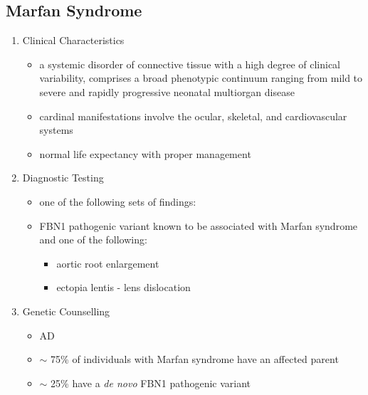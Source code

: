 \documentclass[12pt]{scrartcl}
\begin{document}
\subsection{Marfan Syndrome}
\label{sec:org119cb48}
\begin{enumerate}
\item Clinical Characteristics
\label{sec:org92b42e1}
\begin{itemize}
\item a systemic disorder of connective tissue with a high degree of
clinical variability, comprises a broad phenotypic continuum ranging
from mild to severe and rapidly progressive neonatal multiorgan
disease
\item cardinal manifestations involve the ocular, skeletal, and
cardiovascular systems
\item normal life expectancy with proper management
\end{itemize}
\item Diagnostic Testing
\label{sec:org0484508}
\begin{itemize}
\item one of the following sets of findings:

\item FBN1 pathogenic variant known to be associated with Marfan syndrome
and one of the following:
\begin{itemize}
\item aortic root enlargement
\item ectopia lentis - lens dislocation
\end{itemize}
\end{itemize}

\item Genetic Counselling
\label{sec:orgd0c2030}
\begin{itemize}
\item AD
\item \(\sim\) 75\% of individuals with Marfan syndrome have an affected
parent
\item \(\sim\) 25\% have a \emph{de novo} FBN1 pathogenic variant
\end{itemize}
\end{enumerate}
\end{document}
